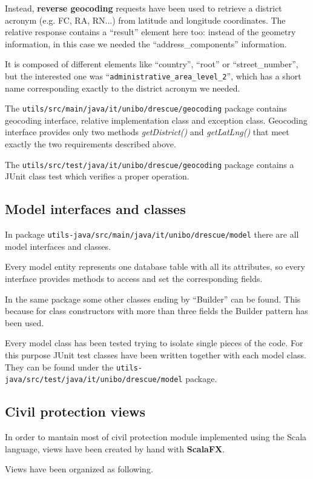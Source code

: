\documentclass[a4paper,12pt]{report}
\begin{document}
Instead, \textbf{reverse geocoding} requests have been used to retrieve a district acronym (e.g. FC, RA, RN...) from latitude and longitude coordinates. The relative response contains a ``result'' element here too: instead of the geometry information, in this case we needed the ``address\_components'' information. 

It is composed of different elements like ``country'', ``root'' or ``street\_number'', but the interested one was ``\texttt{administrative\_area\_level\_2}'', which has a short name corresponding exactly to the district acronym we needed.

The \texttt{utils/src/main/java/it/unibo/drescue/geocoding} package contains geocoding interface, relative implementation class and exception class. Geocoding interface provides only two methods \emph{getDistrict()} and \emph{getLatLng()} that meet exactly the two requirements described above.

The \texttt{utils/src/test/java/it/unibo/drescue/geocoding} package contains a JUnit class test which verifies a proper operation.

\subsection{Model interfaces and classes}
In package \texttt{utils-java/src/main/java/it/unibo/drescue/model} there are all model interfaces and classes.

Every model entity represents one database table with all its attributes, so every interface provides methods to access and set the corresponding fields.

In the same package some other classes ending by ``Builder'' can be found. This because for class constructors with more than three fields the Builder pattern has been used.

Every model class has been tested trying to isolate single pieces of the code. For this purpose JUnit test classes have been written together with each model class. They can be found under the \texttt{utils-java/src/test/java/it/unibo/drescue/model} package.

\subsection{Civil protection views}
In order to mantain most of civil protection module implemented using the Scala language, views have been created by hand with \textbf{ScalaFX}. 

Views have been organized as following.
\end{document}
